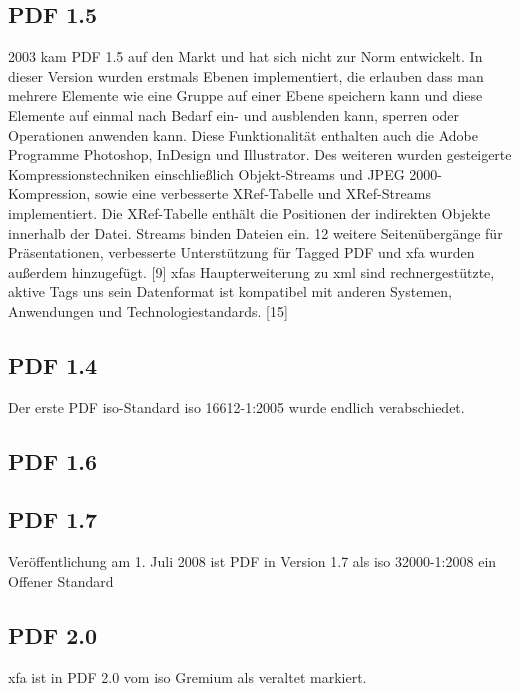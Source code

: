\subsection{PDF 1.5}
2003 kam PDF 1.5 auf den Markt und hat sich nicht zur Norm entwickelt. In dieser Version wurden erstmals Ebenen implementiert, die erlauben dass man mehrere Elemente wie eine Gruppe auf einer Ebene speichern kann und diese Elemente auf einmal nach Bedarf ein- und ausblenden kann, sperren oder Operationen anwenden kann. Diese Funktionalität enthalten auch die Adobe Programme Photoshop, InDesign und Illustrator. Des weiteren wurden gesteigerte Kompressionstechniken einschließlich Objekt-Streams und JPEG 2000-Kompression, sowie eine verbesserte XRef-Tabelle und XRef-Streams implementiert.
Die XRef-Tabelle enthält die Positionen der indirekten Objekte innerhalb der Datei. Streams binden Dateien ein. 12 weitere Seitenübergänge für Präsentationen, verbesserte Unterstützung für Tagged PDF und \gls{xfa} wurden außerdem hinzugefügt. [9] \gls{xfa}s Haupterweiterung zu \gls{xml} sind rechnergestützte, aktive Tags uns sein Datenformat ist kompatibel mit anderen Systemen, Anwendungen und Technologiestandards. [15]

\subsection{PDF 1.4}
Der erste PDF \gls{iso}-Standard \gls{iso} 16612-1:2005 wurde endlich verabschiedet.

\subsection{PDF 1.6}

\subsection{PDF 1.7}
Veröffentlichung am 1. Juli 2008 ist PDF in Version 1.7 als \gls{iso} 32000-1:2008 ein Offener Standard

\subsection{PDF 2.0}
\gls{xfa} ist in PDF 2.0 vom \gls{iso} Gremium als veraltet markiert.